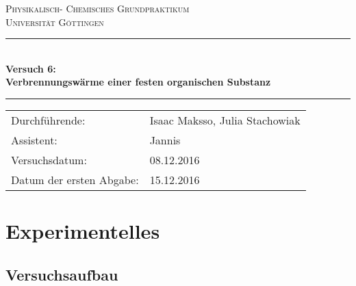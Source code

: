 \documentclass[12pt,a4paper,titlepage,headinclude,bibtotoc]{scrartcl}
\begin{document}
\begin{titlepage}
\centering
\textsc{\Large Physikalisch- Chemisches Grundpraktikum\\[1.5ex] Universität Göttingen}

\vspace*{0.5cm}

\rule{\textwidth}{1pt}\\[0.5cm]
{\huge \bfseries
  Versuch 6: \\[1.5ex]
  Verbrennungswärme einer festen organischen Substanz}\\[0.5cm]
\rule{\textwidth}{1pt}

\vspace*{0.5cm}


\begin{Large}
\begin{tabular}{ll}
Durchführende: &  Isaac Maksso, Julia Stachowiak\\
Assistent: & Jannis \\
Versuchsdatum: & 08.12.2016\\
Datum der ersten Abgabe: & 15.12.2016\\
\end{tabular}
\end{Large}

\vspace*{0.5cm}




\vspace{1.3cm} 
\end{titlepage}


\tableofcontents %

\section{Experimentelles}

\subsection{Versuchsaufbau}
\end{document}
